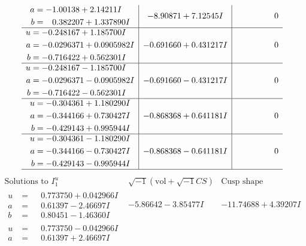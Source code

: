 \documentclass[1p]{elsarticle_modified}
\theoremstyle{definition}
\newcommand{\I}{\sqrt{-1}}
\begin{document}
$$\begin{array}{c|c|c}
\begin{aligned}
a &= -1.00138 + 2.14211 I \\
b &= \phantom{-}0.382207 + 1.337890 I\end{aligned}
 & -8.90871 + 7.12545 I & \phantom{-0.000000 } 0 \\ \hline\begin{aligned}
u &= -0.248167 + 1.185700 I \\
a &= -0.0296371 + 0.0905982 I \\
b &= -0.716422 + 0.562301 I\end{aligned}
 & -0.691660 + 0.431217 I & \phantom{-0.000000 } 0 \\ \hline\begin{aligned}
u &= -0.248167 - 1.185700 I \\
a &= -0.0296371 - 0.0905982 I \\
b &= -0.716422 - 0.562301 I\end{aligned}
 & -0.691660 - 0.431217 I & \phantom{-0.000000 } 0 \\ \hline\begin{aligned}
u &= -0.304361 + 1.180290 I \\
a &= -0.344166 + 0.730427 I \\
b &= -0.429143 + 0.995944 I\end{aligned}
 & -0.868368 + 0.641181 I & \phantom{-0.000000 } 0 \\ \hline\begin{aligned}
u &= -0.304361 - 1.180290 I \\
a &= -0.344166 - 0.730427 I \\
b &= -0.429143 - 0.995944 I\end{aligned}
 & -0.868368 - 0.641181 I & \phantom{-0.000000 } 0\\
 \hline 
 \end{array}$$\newpage$$\begin{array}{c|c|c}  
\text{Solutions to }I^u_{1}& \I (\text{vol} + \sqrt{-1}CS) & \text{Cusp shape}\\
 \hline 
\begin{aligned}
u &= \phantom{-}0.773750 + 0.042966 I \\
a &= \phantom{-}0.61397 - 2.46697 I \\
b &= \phantom{-}0.80451 - 1.46360 I\end{aligned}
 & -5.86642 - 3.85477 I & -11.74688 + 4.39207 I \\ \hline\begin{aligned}
u &= \phantom{-}0.773750 - 0.042966 I \\
a &= \phantom{-}0.61397 + 2.46697 I \\

\end{aligned}
\end{array}$$
\end{document}
